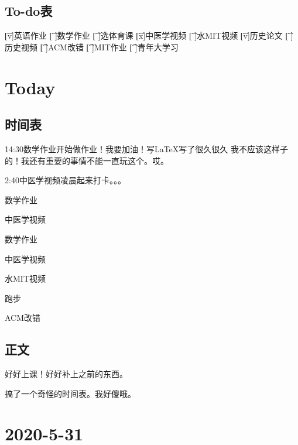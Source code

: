 \documentclass{peterlitsdoc}
\begin{document}
\subsection{To-do表}

\begin{plttodoenv}{4}
\t[v]英语作业       \t[ ]数学作业       \t[ ]选体育课       \t[x]中医学视频
\t[ ]水MIT视频      \t[v]历史论文       \t[ ]历史视频       \t[ ]ACM改错
\t[ ]MIT作业        \t[ ]青年大学习
\end{plttodoenv}




\section{Today}

\subsection{时间表}
\begin{pltplan}
\item[x]{14:30}{数学作业}{开始做作业！我要加油！写\LaTeX{}写了很久很久
    我不应该这样子的！我还有重要的事情不能一直玩这个。哎。}
\item[x]{2:40}{中医学视频}{凌晨起来打卡。。。}
\item[ ]{}{数学作业}{}
\item[ ]{}{中医学视频}{}
\item[ ]{}{数学作业}{}
\item[ ]{}{中医学视频}{}
\item[ ]{}{水MIT视频}{}
\item[ ]{}{跑步}{}
\item[ ]{}{ACM改错}{}
\end{pltplan}

\subsection{正文}

好好上课！好好补上之前的东西。

搞了一个奇怪的时间表。我好傻哦。

\section{2020-5-31}
\end{document}
